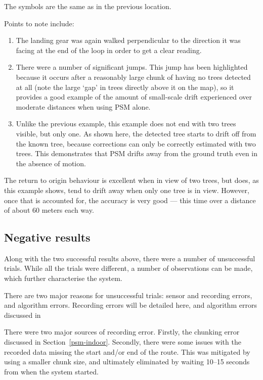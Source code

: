 \documentclass[12pt,oneside,a4paper]{book}
\begin{document}
The symbols are the same as in the previous location.

Points to note include:
\begin{enumerate}[A:]
\item The landing gear was again walked perpendicular to the direction
  it was facing at the end of the loop in order to get a clear
  reading.
\item There were a number of significant jumps. This jump has been
  highlighted because it occurs after a reasonably large chunk of
  having no trees detected at all (note the large `gap' in trees
  directly above it on the map), so it provides a good example of
  the amount of small-scale drift experienced over moderate distances
  when using PSM alone.
\item Unlike the previous example, this example does not end with two
  trees visible, but only one. As shown here, the detected tree starts
  to drift off from the known tree, because corrections can only be
  correctly estimated with two trees. This demonstrates that PSM
  drifts away from the ground truth even in the absence of motion.
\end{enumerate}

The return to origin behaviour is excellent when in view of two trees,
but does, as this example shows, tend to drift away when only one tree
is in view. However, once that is accounted for, the accuracy is very
good --- this time over a distance of about 60 meters each way.

\subsection{Negative results}
\label{sec:negative-results}

Along with the two successful results above, there were a number of
unsuccessful trials. While all the trials were different, a number of
observations can be made, which further characterise the system.

There are two major reasons for unsuccessful trials: sensor and
recording errors, and algorithm errors. Recording errors will be
detailed here, and algorithm errors discussed in 

There were two major sources of recording error. Firstly, the chunking
error discussed in Section~\ref{psm-indoor}. Secondly, there were some
issues with the recorded data missing the start and/or end of the
route. This was mitigated by using a smaller chunk size, and
ultimately eliminated by waiting 10--15 seconds from when the system
started.
\end{document}
